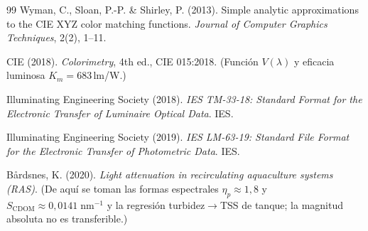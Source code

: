 \documentclass[11pt,a4paper]{article}
\begin{document}
\begin{thebibliography}{99}
 Wyman, C., Sloan, P.-P. \& Shirley, P. (2013). Simple analytic
approximations to the CIE XYZ color matching functions. \emph{Journal of Computer
Graphics Techniques}, 2(2), 1--11.

 CIE (2018). \emph{Colorimetry}, 4th ed., CIE 015:2018. (Función
$V(\lambda)$ y eficacia luminosa $K_m=683\,$lm/W.)

 Illuminating Engineering Society (2018). \emph{IES TM-33-18:
Standard Format for the Electronic Transfer of Luminaire Optical Data}. IES.

 Illuminating Engineering Society (2019). \emph{IES LM-63-19:
Standard File Format for the Electronic Transfer of Photometric Data}. IES.

 Bårdsnes, K. (2020). \emph{Light attenuation in
recirculating aquaculture systems (RAS)}. (De aquí se toman las formas espectrales
$\eta_p\approx1{,}8$ y $S_\text{CDOM}\approx0{,}0141\;\mathrm{nm^{-1}}$ y la
regresión turbidez$\to$TSS de tanque; la magnitud absoluta no es transferible.)

\end{thebibliography}
\end{document}
